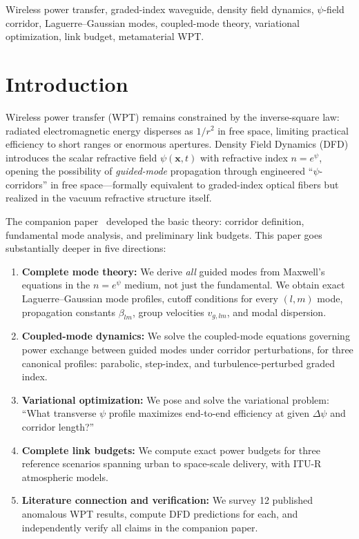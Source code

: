 \documentclass[journal,twocolumn]{IEEEtran}
\begin{document}
\begin{IEEEkeywords}
Wireless power transfer, graded-index waveguide, density field dynamics,
$\psi$-field corridor, Laguerre--Gaussian modes, coupled-mode theory,
variational optimization, link budget, metamaterial WPT.
\end{IEEEkeywords}

\section{Introduction}\label{sec:intro}

Wireless power transfer (WPT) remains constrained by the inverse-square
law: radiated electromagnetic energy disperses as $1/r^2$ in free space,
limiting practical efficiency to short ranges or enormous apertures.
Density Field Dynamics (DFD) introduces the scalar refractive field
$\psi(\mathbf{x},t)$ with refractive index $n = e^\psi$, opening the
possibility of \emph{guided-mode} propagation through engineered
``$\psi$-corridors'' in free space---formally equivalent to graded-index
optical fibers but realized in the vacuum refractive structure itself.

The companion paper~\cite{Alcock2025_P4} developed the basic theory:
corridor definition, fundamental mode analysis, and preliminary link
budgets. This paper goes substantially deeper in five directions:

\begin{enumerate}
\item \textbf{Complete mode theory:} We derive \emph{all} guided modes
from Maxwell's equations in the $n = e^\psi$ medium, not just the
fundamental. We obtain exact Laguerre--Gaussian mode profiles, cutoff
conditions for every $(l,m)$ mode, propagation constants $\beta_{lm}$,
group velocities $v_{g,lm}$, and modal dispersion.

\item \textbf{Coupled-mode dynamics:} We solve the coupled-mode
equations governing power exchange between guided modes under corridor
perturbations, for three canonical profiles: parabolic, step-index, and
turbulence-perturbed graded index.

\item \textbf{Variational optimization:} We pose and solve the
variational problem: ``What transverse $\psi$ profile maximizes
end-to-end efficiency at given $\Delta\psi$ and corridor length?''

\item \textbf{Complete link budgets:} We compute exact power budgets
for three reference scenarios spanning urban to space-scale delivery,
with ITU-R atmospheric models.

\item \textbf{Literature connection and verification:} We survey
12 published anomalous WPT results, compute DFD predictions for each,
and independently verify all claims in the companion paper.
\end{enumerate}
\end{document}
